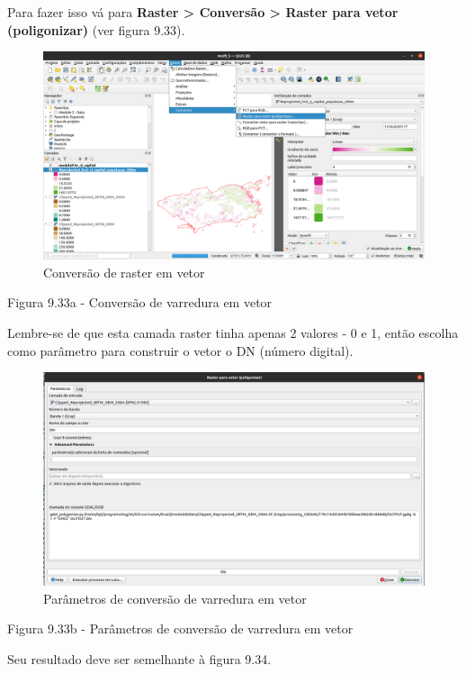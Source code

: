 \documentclass[
  portuguese,
]{krantz}
\begin{document}
Para fazer isso vá para \textbf{Raster \textgreater{} Conversão \textgreater{} Raster para vetor (poligonizar)} (ver figura 9.33).

\begin{figure}
\centering
\includegraphics{media/modulo9/fig933_a.png}
\caption{Conversão de raster em vetor}
\end{figure}

Figura 9.33a - Conversão de varredura em vetor

Lembre-se de que esta camada raster tinha apenas 2 valores - 0 e 1, então escolha como parâmetro para construir o vetor o DN (número digital).

\begin{figure}
\centering
\includegraphics{media/modulo9/fig933_b.png}
\caption{Parâmetros de conversão de varredura em vetor}
\end{figure}

Figura 9.33b - Parâmetros de conversão de varredura em vetor

Seu resultado deve ser semelhante à figura 9.34.
\end{document}
